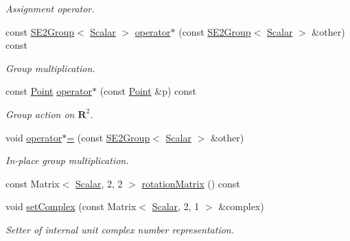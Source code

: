 \begin{DoxyCompactItemize}
\begin{DoxyCompactList}\small\item\em Assignment operator. \end{DoxyCompactList}\item 
const \hyperlink{class_sophus_1_1_s_e2_group}{S\+E2\+Group}$<$ \hyperlink{class_sophus_1_1_s_e2_group_base_a1bad7970c24437df7f4a34281ff147fe}{Scalar} $>$ \hyperlink{class_sophus_1_1_s_e2_group_base_a36f68c8a9630eed4405f1b89210d421e}{operator$\ast$} (const \hyperlink{class_sophus_1_1_s_e2_group}{S\+E2\+Group}$<$ \hyperlink{class_sophus_1_1_s_e2_group_base_a1bad7970c24437df7f4a34281ff147fe}{Scalar} $>$ \&other) const 
\begin{DoxyCompactList}\small\item\em Group multiplication. \end{DoxyCompactList}\item 
const \hyperlink{class_sophus_1_1_s_e2_group_base_add8b024098bc6fcecdefb42229fa881b}{Point} \hyperlink{class_sophus_1_1_s_e2_group_base_aa1313016f17d4ed280446ad3fef35fff}{operator$\ast$} (const \hyperlink{class_sophus_1_1_s_e2_group_base_add8b024098bc6fcecdefb42229fa881b}{Point} \&p) const 
\begin{DoxyCompactList}\small\item\em Group action on $ \mathbf{R}^2 $. \end{DoxyCompactList}\item 
void \hyperlink{class_sophus_1_1_s_e2_group_base_a5016208d6f5b02464cb4553984e37f29}{operator$\ast$=} (const \hyperlink{class_sophus_1_1_s_e2_group}{S\+E2\+Group}$<$ \hyperlink{class_sophus_1_1_s_e2_group_base_a1bad7970c24437df7f4a34281ff147fe}{Scalar} $>$ \&other)
\begin{DoxyCompactList}\small\item\em In-\/place group multiplication. \end{DoxyCompactList}\item 
const Matrix$<$ \hyperlink{class_sophus_1_1_s_e2_group_base_a1bad7970c24437df7f4a34281ff147fe}{Scalar}, 2, 2 $>$ \hyperlink{class_sophus_1_1_s_e2_group_base_ae70df20893171b2b96a98fae351d1916}{rotation\+Matrix} () const 
\item 
void \hyperlink{class_sophus_1_1_s_e2_group_base_a643d4629d8331be7492b3db74b2bb084}{set\+Complex} (const Matrix$<$ \hyperlink{class_sophus_1_1_s_e2_group_base_a1bad7970c24437df7f4a34281ff147fe}{Scalar}, 2, 1 $>$ \&complex)
\begin{DoxyCompactList}\small\item\em Setter of internal unit complex number representation. \end{DoxyCompactList}\item 

\end{DoxyCompactItemize}
